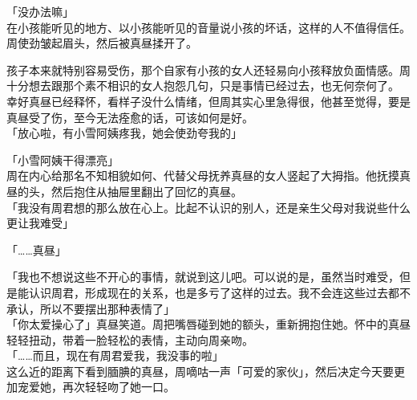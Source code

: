「没办法嘛」\\

在小孩能听见的地方、以小孩能听见的音量说小孩的坏话，这样的人不值得信任。周使劲皱起眉头，然后被真昼揉开了。

孩子本来就特别容易受伤，那个自家有小孩的女人还轻易向小孩释放负面情感。周十分想去跟那个素不相识的女人抱怨几句，只是事情已经过去，也无何奈何了。\\

幸好真昼已经释怀，看样子没什么情绪，但周其实心里急得很，他甚至觉得，要是真昼受了伤，至今无法痊愈的话，可该如何是好。\\

「放心啦，有小雪阿姨疼我，她会使劲夸我的」

「小雪阿姨干得漂亮」\\

周在内心给那名不知相貌如何、代替父母抚养真昼的女人竖起了大拇指。他抚摸真昼的头，然后抱住从抽屉里翻出了回忆的真昼。\\

「我没有周君想的那么放在心上。比起不认识的别人，还是亲生父母对我说些什么更让我难受」

「……真昼」

「我也不想说这些不开心的事情，就说到这儿吧。可以说的是，虽然当时难受，但是能认识周君，形成现在的关系，也是多亏了这样的过去。我不会连这些过去都不承认，所以不要摆出那种表情了」\\

「你太爱操心了」真昼笑道。周把嘴唇碰到她的额头，重新拥抱住她。怀中的真昼轻轻扭动，带着一脸轻松的表情，主动向周亲吻。\\

「……而且，现在有周君爱我，我没事的啦」\\

这么近的距离下看到腼腆的真昼，周嘀咕一声「可爱的家伙」，然后决定今天要更加宠爱她，再次轻轻吻了她一口。
